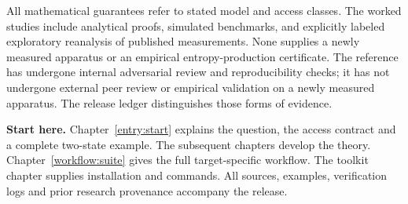 \documentclass[11pt,oneside]{book}
\theoremstyle{definition}
\theoremstyle{remark}
\begin{document}
All mathematical guarantees refer to stated model and access classes. The worked studies include analytical proofs, simulated benchmarks, and
explicitly labeled exploratory reanalysis of published measurements. None
supplies a newly measured apparatus or an empirical entropy-production certificate. The reference has undergone internal adversarial review and reproducibility checks; it has not undergone external peer review or empirical validation on a newly measured apparatus. The release ledger distinguishes those forms of evidence.

\bigskip
\noindent\textbf{Start here.} Chapter~\ref{entry:start} explains the question, the access contract and a complete two-state example. The subsequent chapters develop the theory. Chapter~\ref{workflow:suite} gives the full target-specific workflow. The toolkit chapter supplies installation and commands. All sources, examples, verification logs and prior research provenance accompany the release.

\tableofcontents
\end{document}
